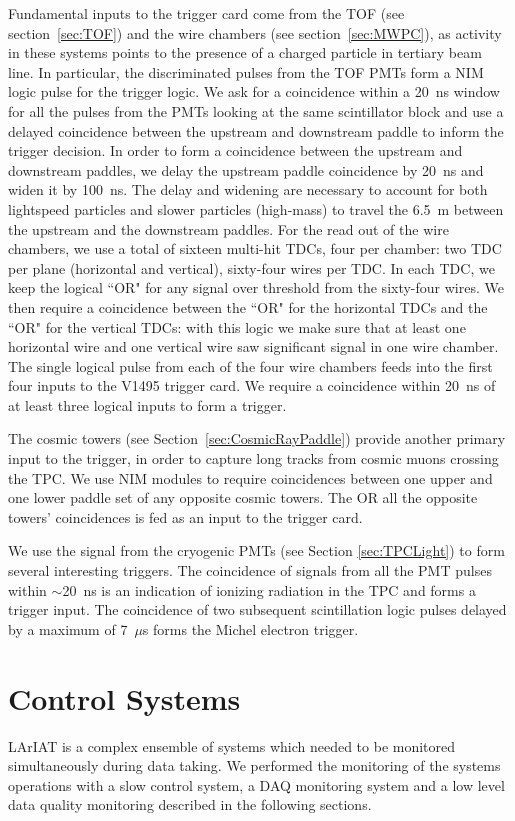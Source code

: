 Fundamental inputs to the trigger card come from the TOF (see section~\ref{sec:TOF}) and the wire chambers (see section~\ref{sec:MWPC}), as activity in these systems points to the presence of a charged particle in tertiary beam line.
In particular, the discriminated pulses from the TOF PMTs form a NIM logic pulse for the trigger logic. We ask for a coincidence within a 20~ns window for all the pulses from the PMTs looking at the same scintillator block and use a delayed coincidence between the upstream and downstream paddle to inform the trigger decision. In order to form a coincidence between the upstream and downstream paddles, we delay the upstream paddle coincidence by 20~ns and widen it by 100~ns. The delay and widening are necessary to account for both  lightspeed particles and slower particles (high-mass) to travel the 6.5~m between the upstream and the downstream paddles. 
For the read out of the wire chambers, we use a total of sixteen multi-hit TDCs\cite{Sten}, four per chamber: two TDC per plane (horizontal and vertical), sixty-four wires per TDC. In each TDC, we keep the logical ``OR" for any signal over threshold from the sixty-four wires. We then require a coincidence between the ``OR" for the horizontal TDCs and the ``OR" for the vertical TDCs: with this logic we make sure that at least one horizontal wire and one vertical wire saw significant signal in one wire chamber.  The single logical pulse from each of the four wire chambers feeds into the first four inputs to the V1495 trigger card. We require a coincidence within 20~ns of at least three logical inputs to form a trigger.


The cosmic towers (see Section~\ref{sec:CosmicRayPaddle}) provide another primary input to the trigger, in order to capture long tracks from cosmic muons crossing the TPC. We use NIM modules to require coincidences between one upper and one lower paddle set of any opposite cosmic towers. The OR all the opposite towers' coincidences is fed as an input to the trigger card. 

We use the signal from the cryogenic PMTs (see Section \ref{sec:TPCLight}) to form several interesting triggers. The coincidence of signals from all the PMT pulses within $\sim$20~ns is an indication of ionizing radiation in the TPC and forms a trigger input.  The coincidence of two subsequent scintillation logic pulses delayed by a maximum of  7~$\mu$s forms the Michel electron trigger. 




\section{Control Systems}
LArIAT is a complex ensemble of systems which needed to be monitored simultaneously during data taking.  We performed the monitoring of the systems operations with a slow control system, a DAQ monitoring system and a low level data quality monitoring described in the following sections.

